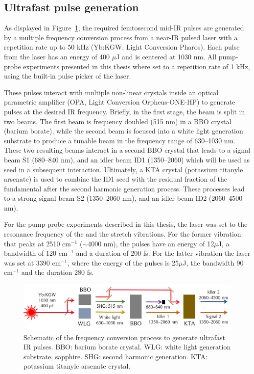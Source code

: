 \subsection{Ultrafast pulse generation}

As displayed in Figure~\ref{UltraFastPulses}, the required femtosecond mid-IR pulses are generated by a multiple frequency conversion process from a near-IR pulsed laser with a repetition rate up to 50 kHz (Yb:KGW, Light Conversion Pharos). Each pulse from the laser has an energy of 400 $\mu$J and is centered at 1030 nm. All pump-probe experiments presented in this thesis where set to a repetition rate of 1 kHz, using the built-in pulse picker of the laser.

These pulses interact with multiple non-linear crystals inside an optical parametric amplifier (OPA, Light Conversion Orpheus-ONE-HP) to generate pulses at the desired IR frequency. Briefly, in the first stage, the beam is split in two beams. The first beam is frequency doubled (515 nm) in a BBO crystal (barium borate), while the second beam is focused into a white light generation substrate to produce a tunable beam in the frequency range of 630--1030 nm. These two resulting beams interact in a second BBO crystal that leads to a signal beam S1 (680--840 nm), and an idler beam ID1 (1350--2060) which will be used as seed in a subsequent interaction. Ultimately, a KTA crystal (potassium titanyle arsenate) is used to combine the ID1 seed with the residual fraction of the fundamental after the second harmonic generation process. These processes lead to a strong signal beam S2 (1350--2060 nm), and an idler beam ID2 (2060--4500 nm).

For the pump-probe experiments described in this thesis, the laser was set to the resonance frequency of the  and the  stretch vibrations. For the former vibration that peaks at 2510 cm$^{-1}$ ($\sim$4000 nm), the pulses have an energy of 12$\mu$J, a bandwidth of 120 cm$^{-1}$ and a duration of 200 fs. For the latter vibration the laser was set at 3390 cm$^{-1}$, where the energy of the pulses is 25$\mu$J, the bandwidth 90 cm$^{-1}$ and the duration 280 fs.


\begin{figure}[t!]
	\centering
	\includegraphics[width=1.0\figwidth]{chapters/Chapter3_Methods2/Graphs/PulsesScheme.png} %
	\caption{Schematic of the frequency conversion process to generate ultrafast IR pulses. BBO: barium borate crystal. WLG: white light generation substrate, sapphire. SHG: second harmonic generation. KTA: potassium titanyle arsenate crystal.}
	\label{UltraFastPulses}
\end{figure}






